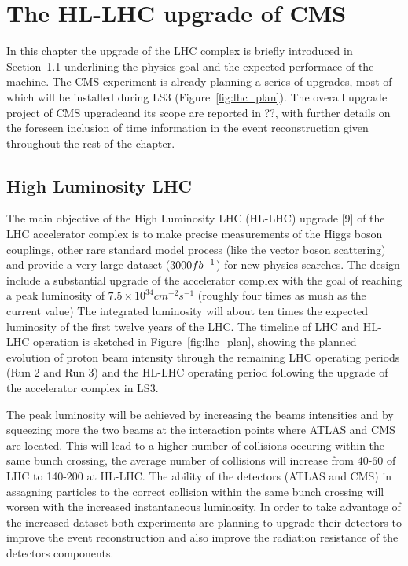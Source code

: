 \providecommand{\sixbysix}{\ensuremath{6\times 6\mathrm{~cm}^{2}}\xspace}
\providecommand{\threebythree}{\ensuremath{3\times 3\mathrm{~cm}^{2}}\xspace}
\providecommand{\twobytwo}{\ensuremath{2\times 2\mathrm{~cm}^{2}}\xspace}
\providecommand{\onebyone}{\ensuremath{1\times 1\mathrm{~cm}^{2}}\xspace}

\chapter{The HL-LHC upgrade of CMS}
\label{chapter:cms_upgrade}

In this chapter the upgrade of the LHC complex is briefly introduced in Section~\ref{upgrade_lhc}
underlining the physics goal and the expected performace of the machine. The CMS experiment is already planning
a series of upgrades, most of which will be installed during LS3 (Figure~\ref{fig:lhc_plan}).
The overall upgrade project of CMS upgradeand its scope are reported in ??, with further details on the
foreseen inclusion of time information in the event reconstruction given throughout the rest of the chapter.

\section{High Luminosity LHC}
\label{upgrade_lhc}

The main objective of the High Luminosity LHC (HL-LHC) upgrade [9] of the LHC accelerator complex
is to make precise measurements of the Higgs boson couplings, other rare standard model process (like the vector boson scattering)
and provide a very large dataset ($3000fb^{-1}$) for new physics searches.
The design include a substantial upgrade of the accelerator complex with the goal of reaching
a peak luminosity of $7.5\times10^{34} cm^{-2}s^{-1}$ (roughly four times as mush as the current value)
The integrated luminosity will about ten times the expected luminosity of the first twelve
years of the LHC.
The timeline of LHC and HL-LHC operation is sketched in Figure~\ref{fig:lhc_plan}, showing the planned
evolution of proton beam intensity through the remaining LHC operating periods (Run 2 and Run 3)
and the HL-LHC operating period following the upgrade of the accelerator complex in LS3.

The peak luminosity will be achieved by increasing the beams intensities and by squeezing more the two beams at the
interaction points where ATLAS and CMS are located.
This will lead to a higher number of collisions occuring within the same bunch crossing, the
average number of collisions will increase from 40-60 of LHC to 140-200 at HL-LHC.
The ability of the detectors (ATLAS and CMS) in assagning particles to the correct collision within the same bunch crossing
will worsen with the increased instantaneous luminosity. In order to take advantage of the increased dataset
both experiments are planning to upgrade their detectors to improve the event reconstruction and also improve
the radiation resistance of the detectors components.



